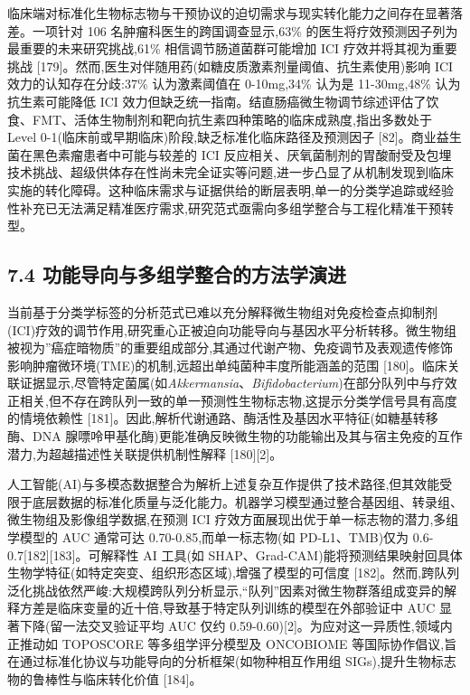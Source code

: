 临床端对标准化生物标志物与干预协议的迫切需求与现实转化能力之间存在显著落差。一项针对 106 名肿瘤科医生的跨国调查显示,63\% 的医生将疗效预测因子列为最重要的未来研究挑战,61\% 相信调节肠道菌群可能增加 ICI 疗效并将其视为重要挑战 {[}179{]}。然而,医生对伴随用药(如糖皮质激素剂量阈值、抗生素使用)影响 ICI 效力的认知存在分歧:37\% 认为激素阈值在 0-10mg,34\% 认为是 11-30mg,48\% 认为抗生素可能降低 ICI 效力但缺乏统一指南。结直肠癌微生物调节综述评估了饮食、FMT、活体生物制剂和靶向抗生素四种策略的临床成熟度,指出多数处于 Level 0-1(临床前或早期临床)阶段,缺乏标准化临床路径及预测因子 {[}82{]}。商业益生菌在黑色素瘤患者中可能与较差的 ICI 反应相关、厌氧菌制剂的胃酸耐受及包埋技术挑战、超级供体存在性尚未完全证实等问题,进一步凸显了从机制发现到临床实施的转化障碍。这种临床需求与证据供给的断层表明,单一的分类学追踪或经验性补充已无法满足精准医疗需求,研究范式亟需向多组学整合与工程化精准干预转型。

\subsection{7.4 功能导向与多组学整合的方法学演进}\label{ux529fux80fdux5bfcux5411ux4e0eux591aux7ec4ux5b66ux6574ux5408ux7684ux65b9ux6cd5ux5b66ux6f14ux8fdb}

当前基于分类学标签的分析范式已难以充分解释微生物组对免疫检查点抑制剂(ICI)疗效的调节作用,研究重心正被迫向功能导向与基因水平分析转移。微生物组被视为''癌症暗物质''的重要组成部分,其通过代谢产物、免疫调节及表观遗传修饰影响肿瘤微环境(TME)的机制,远超出单纯菌种丰度所能涵盖的范围 {[}180{]}。临床关联证据显示,尽管特定菌属(如\emph{Akkermansia}、\emph{Bifidobacterium})在部分队列中与疗效正相关,但不存在跨队列一致的单一预测性生物标志物,这提示分类学信号具有高度的情境依赖性 {[}181{]}。因此,解析代谢通路、酶活性及基因水平特征(如糖基转移酶、DNA 腺嘌呤甲基化酶)更能准确反映微生物的功能输出及其与宿主免疫的互作潜力,为超越描述性关联提供机制性解释 {[}180{]}{[}2{]}。

人工智能(AI)与多模态数据整合为解析上述复杂互作提供了技术路径,但其效能受限于底层数据的标准化质量与泛化能力。机器学习模型通过整合基因组、转录组、微生物组及影像组学数据,在预测 ICI 疗效方面展现出优于单一标志物的潜力,多组学模型的 AUC 通常可达 0.70-0.85,而单一标志物(如 PD-L1、TMB)仅为 0.6-0.7{[}182{]}{[}183{]}。可解释性 AI 工具(如 SHAP、Grad-CAM)能将预测结果映射回具体生物学特征(如特定突变、组织形态区域),增强了模型的可信度 {[}182{]}。然而,跨队列泛化挑战依然严峻:大规模跨队列分析显示,``队列''因素对微生物群落组成变异的解释方差是临床变量的近十倍,导致基于特定队列训练的模型在外部验证中 AUC 显著下降(留一法交叉验证平均 AUC 仅约 0.59-0.60){[}2{]}。为应对这一异质性,领域内正推动如 TOPOSCORE 等多组学评分模型及 ONCOBIOME 等国际协作倡议,旨在通过标准化协议与功能导向的分析框架(如物种相互作用组 SIGs),提升生物标志物的鲁棒性与临床转化价值 {[}184{]}。

